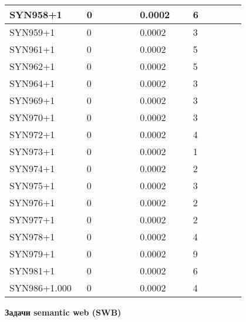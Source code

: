 \begin{longtable}[H]{|p{0.2\linewidth}|p{0.2\linewidth}|p{0.2\linewidth}|p{0.2\linewidth}|}
\hline
SYN958+1 &  0 &  0.0002 &  6 \\
\hline
SYN959+1 &  0 &  0.0002 &  3 \\
\hline
SYN961+1 &  0 &  0.0002 &  5 \\
\hline
SYN962+1 &  0 &  0.0002 &  5 \\
\hline
SYN964+1 &  0 &  0.0002 &  3 \\
\hline
SYN969+1 &  0 &  0.0002 &  3 \\
\hline
SYN970+1 &  0 &  0.0002 &  3 \\
\hline
SYN972+1 &  0 &  0.0002 &  4 \\
\hline
SYN973+1 &  0 &  0.0002 &  1 \\
\hline
SYN974+1 &  0 &  0.0002 &  2 \\
\hline
SYN975+1 &  0 &  0.0002 &  3 \\
\hline
SYN976+1 &  0 &  0.0002 &  2 \\
\hline
SYN977+1 &  0 &  0.0002 &  2 \\
\hline
SYN978+1 &  0 &  0.0002 &  4 \\
\hline
SYN979+1 &  0 &  0.0002 &  9 \\
\hline
SYN981+1 &  0 &  0.0002 &  6 \\
\hline
SYN986+1.000 &  0 &  0.0002 &  4 \\
\hline
\end{longtable}


\textbf{Задачи semantic web (SWB)}

